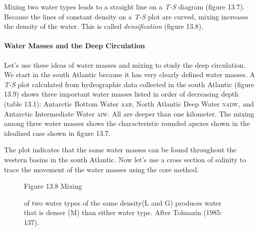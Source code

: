 Mixing two water types leads to a straight
line on a \textit{T-S} diagram (figure 13.7). Because the lines of
constant density on a \textit{T-S} plot are curved,
mixing increases the density of the
water. This is called
\textit{densification} (figure 13.8).

\paragraph{Water Masses and the Deep Circulation}
Let's use these ideas of water
masses and mixing to study the deep
circulation. We start in the south Atlantic because it has very
clearly defined water masses. A \textit{T-S} plot calculated from
hydrographic data collected
in the south Atlantic (figure 13.9) shows three important water masses
listed in order of decreasing depth (table 13.1): Antarctic Bottom
Water \textsc{aab}, North Atlantic Deep
Water \textsc{nadw}, and Antarctic
Intermediate Water
\textsc{aiw}. All are deeper than one kilometer. The
mixing among three water masses shows
the characteristic rounded apexes shown in the idealized case shown in
figure 13.7.

The plot indicates that the same water masses can be found throughout
the western basins in the south Atlantic. Now let's use a cross
section of salinity to trace the movement of the water masses using
the core method.

\begin{figure}[t!]
\centering
\footnotesize
Figure 13.8 Mixing \rule{0pt}{3ex} of two water types of the same density(L and G) produces water that is denser
(M) than either water type. After Tolmazin (1985: 137).

\label{fig:densification}
\end{figure}

